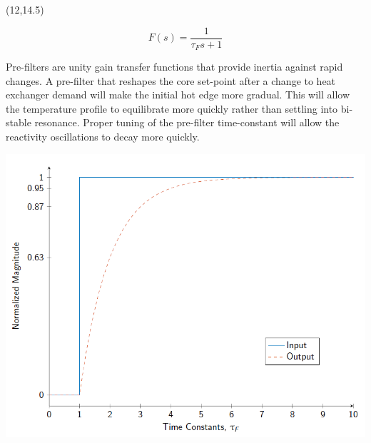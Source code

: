\documentclass{article}
\def\CHead#1{\begin{center}\noindent{\LARGE\color{DarkBlue} #1}\end{center}}
\renewcommand{\LARGE}{\fontsize{43}{54}\selectfont}
\begin{document}
\begin{textblock}{10}(12,14.5)
\CHead{Pre-Filter}
\begin{equation*}\label{eqn:prefilter}
    F(s)=\frac{1}{\tau_F s+1}    
\end{equation*}

Pre-filters are unity gain transfer functions that provide inertia against rapid changes. A pre-filter that reshapes the core set-point after a change to heat exchanger demand will make the initial hot edge more gradual. This will allow the temperature profile to equilibrate more quickly rather than settling into bi-stable resonance. Proper tuning of the pre-filter time-constant will allow the reactivity oscillations to decay more quickly. 

\begin{center}
\includegraphics[width=8in]{Prefilter.png}
\end{center}
\end{textblock}
\end{document}
